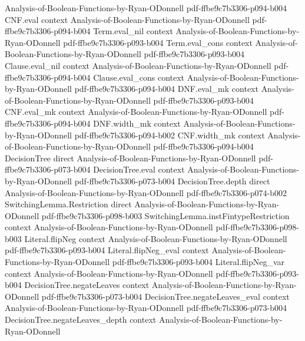 \begin{lemma}
  {Analysis-of-Boolean-Functions-by-Ryan-ODonnell}
  {pdf-ffbe9c7b3306-p094-b004}
\proofstep
  {CNF.eval}
  {context}
  {Analysis-of-Boolean-Functions-by-Ryan-ODonnell}
  {pdf-ffbe9c7b3306-p094-b004}
\proofstep
  {Term.eval_nil}
  {context}
  {Analysis-of-Boolean-Functions-by-Ryan-ODonnell}
  {pdf-ffbe9c7b3306-p093-b004}
\proofstep
  {Term.eval_cons}
  {context}
  {Analysis-of-Boolean-Functions-by-Ryan-ODonnell}
  {pdf-ffbe9c7b3306-p093-b004}
\proofstep
  {Clause.eval_nil}
  {context}
  {Analysis-of-Boolean-Functions-by-Ryan-ODonnell}
  {pdf-ffbe9c7b3306-p094-b004}
\proofstep
  {Clause.eval_cons}
  {context}
  {Analysis-of-Boolean-Functions-by-Ryan-ODonnell}
  {pdf-ffbe9c7b3306-p094-b004}
\proofstep
  {DNF.eval_mk}
  {context}
  {Analysis-of-Boolean-Functions-by-Ryan-ODonnell}
  {pdf-ffbe9c7b3306-p093-b004}
\proofstep
  {CNF.eval_mk}
  {context}
  {Analysis-of-Boolean-Functions-by-Ryan-ODonnell}
  {pdf-ffbe9c7b3306-p094-b004}
\proofstep
  {DNF.width_mk}
  {context}
  {Analysis-of-Boolean-Functions-by-Ryan-ODonnell}
  {pdf-ffbe9c7b3306-p094-b002}
\proofstep
  {CNF.width_mk}
  {context}
  {Analysis-of-Boolean-Functions-by-Ryan-ODonnell}
  {pdf-ffbe9c7b3306-p094-b004}
\proofstep
  {DecisionTree}
  {direct}
  {Analysis-of-Boolean-Functions-by-Ryan-ODonnell}
  {pdf-ffbe9c7b3306-p073-b004}
\proofstep
  {DecisionTree.eval}
  {context}
  {Analysis-of-Boolean-Functions-by-Ryan-ODonnell}
  {pdf-ffbe9c7b3306-p073-b004}
\proofstep
  {DecisionTree.depth}
  {direct}
  {Analysis-of-Boolean-Functions-by-Ryan-ODonnell}
  {pdf-ffbe9c7b3306-p074-b002}
\proofstep
  {SwitchingLemma.Restriction}
  {direct}
  {Analysis-of-Boolean-Functions-by-Ryan-ODonnell}
  {pdf-ffbe9c7b3306-p098-b003}
\proofstep
  {SwitchingLemma.instFintypeRestriction}
  {context}
  {Analysis-of-Boolean-Functions-by-Ryan-ODonnell}
  {pdf-ffbe9c7b3306-p098-b003}
\proofstep
  {Literal.flipNeg}
  {context}
  {Analysis-of-Boolean-Functions-by-Ryan-ODonnell}
  {pdf-ffbe9c7b3306-p093-b004}
\proofstep
  {Literal.flipNeg_eval}
  {context}
  {Analysis-of-Boolean-Functions-by-Ryan-ODonnell}
  {pdf-ffbe9c7b3306-p093-b004}
\proofstep
  {Literal.flipNeg_var}
  {context}
  {Analysis-of-Boolean-Functions-by-Ryan-ODonnell}
  {pdf-ffbe9c7b3306-p093-b004}
\proofstep
  {DecisionTree.negateLeaves}
  {context}
  {Analysis-of-Boolean-Functions-by-Ryan-ODonnell}
  {pdf-ffbe9c7b3306-p073-b004}
\proofstep
  {DecisionTree.negateLeaves_eval}
  {context}
  {Analysis-of-Boolean-Functions-by-Ryan-ODonnell}
  {pdf-ffbe9c7b3306-p073-b004}
\proofstep
  {DecisionTree.negateLeaves_depth}
  {context}
  {Analysis-of-Boolean-Functions-by-Ryan-ODonnell}

\end{lemma}

